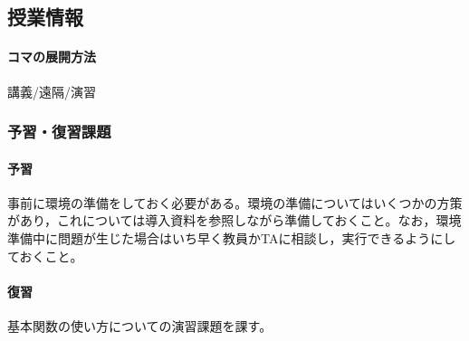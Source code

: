 \subsection{授業情報}
\paragraph{コマの展開方法}
講義/遠隔/演習
\subsubsection{予習・復習課題}
\paragraph{予習}事前に環境の準備をしておく必要がある。環境の準備についてはいくつかの方策があり，これについては導入資料を参照しながら準備しておくこと。なお，環境準備中に問題が生じた場合はいち早く教員かTAに相談し，実行できるようにしておくこと。
\paragraph{復習}基本関数の使い方についての演習課題を課す。